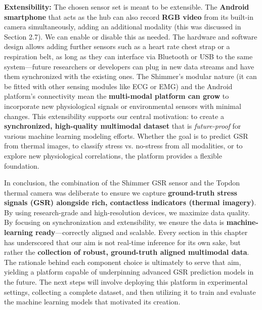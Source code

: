 \textbf{Extensibility:} The chosen sensor set is meant to be extensible. The \textbf{Android smartphone} that acts as the hub can also record \textbf{RGB video} from its built-in camera simultaneously, adding an additional modality (this was discussed in Section 2.7). We can enable or disable this as needed. The hardware and software design allows adding further sensors such as a heart rate chest strap or a respiration belt, as long as they can interface via Bluetooth or USB to the same system—future researchers or developers can plug in new data streams and have them synchronized with the existing ones. The Shimmer's modular nature (it can be fitted with other sensing modules like ECG or EMG) and the Android platform's connectivity mean the \textbf{multi-modal platform can grow} to incorporate new physiological signals or environmental sensors with minimal changes. This extensibility supports our central motivation: to create a \textbf{synchronized, high-quality multimodal dataset} that is \textit{future-proof} for various machine learning modeling efforts. Whether the goal is to predict GSR from thermal images, to classify stress vs. no-stress from all modalities, or to explore new physiological correlations, the platform provides a flexible foundation.

In conclusion, the combination of the Shimmer GSR sensor and the Topdon thermal camera was deliberate to ensure we capture \textbf{ground-truth stress signals (GSR) alongside rich, contactless indicators (thermal imagery)}. By using research-grade and high-resolution devices, we maximize data quality. By focusing on synchronization and extensibility, we ensure the data is \textbf{machine-learning ready}—correctly aligned and scalable. Every section in this chapter has underscored that our aim is not real-time inference for its own sake, but rather the \textbf{collection of robust, ground-truth aligned multimodal data}. The rationale behind each component choice is ultimately to serve that aim, yielding a platform capable of underpinning advanced GSR prediction models in the future. The next steps will involve deploying this platform in experimental settings, collecting a complete dataset, and then utilizing it to train and evaluate the machine learning models that motivated its creation.


